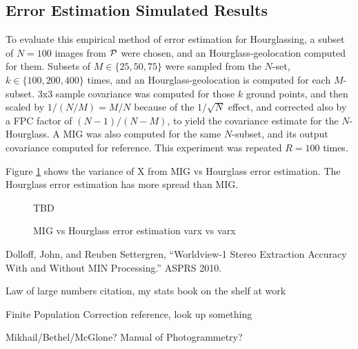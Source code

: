 \documentclass{amsart}
\begin{document}
\subsection{Error Estimation Simulated Results}
To evaluate this empirical method of error estimation for Hourglassing, a subset
of $N=100$ images from $\mathcal{P}$ were chosen, and an Hourglass-geolocation
computed for them. Subsets of $M\in\{25,50,75\}$ were sampled from the $N$-set,
$k\in\{100,200,400\}$ times, and an Hourglass-geolocation is computed for each
$M$-subset. 3x3 sample covariance was computed for those $k$ ground points, and
then scaled by $1/(N/M)=M/N$ because of the $1/\sqrt{N}$ effect, and corrected
also by a FPC factor of $(N-1)/(N-M)$, to yield the covariance estimate for the
$N$-Hourglass. A MIG was also computed for the same $N$-subset, and its output
covariance computed for reference. This experiment was repeated $R=100$ times.

Figure \ref{fig:mig_vs_hourglass_varx} shows the variance of X from MIG vs
Hourglass error estimation. The Hourglass error estimation has more spread than MIG.

\begin{figure}
TBD
\caption{\label{fig:mig_vs_hourglass_varx}MIG vs Hourglass error estimation varx vs varx}
\end{figure}







\begin{thebibliography}{9} %

Dolloff, John, and Reuben Settergren, ``Worldview-1 Stereo
  Extraction Accuracy With and Without MIN Processing.'' ASPRS 2010.

Law of large numbers citation, my stats book on the shelf at work

Finite Population Correction reference, look up something

Mikhail/Bethel/McGlone? Manual of Photogrammetry?

\end{thebibliography}
 
\end{document}
